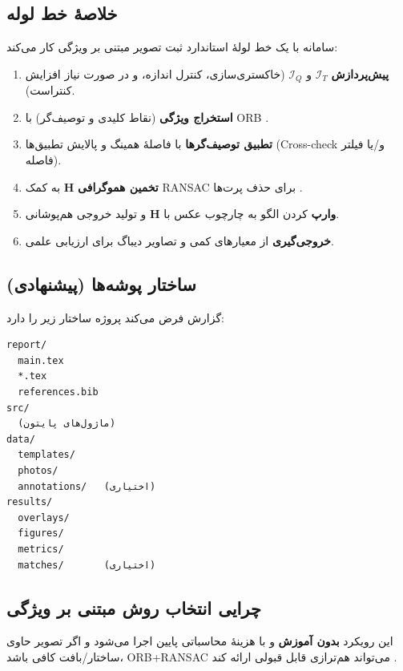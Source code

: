
\subsection{خلاصهٔ خط لوله}
سامانه با یک خط لولهٔ استاندارد ثبت تصویر مبتنی بر ویژگی کار می‌کند:
\begin{enumerate}
  \item \textbf{پیش‌پردازش} $\mathcal{I}_T$ و $\mathcal{I}_Q$ (خاکستری‌سازی، کنترل اندازه، و در صورت نیاز افزایش کنتراست).
  \item \textbf{استخراج ویژگی} (نقاط کلیدی و توصیف‌گر) با ORB \cite{Rublee2011ORB}.
  \item \textbf{تطبیق توصیف‌گرها} با فاصلهٔ همینگ و پالایش تطبیق‌ها (Cross-check و/یا فیلتر فاصله).
  \item \textbf{تخمین هموگرافی} $\mathbf{H}$ به کمک RANSAC برای حذف پرت‌ها \cite{FischlerBolles1981}.
  \item \textbf{وارپ} کردن الگو به چارچوب عکس با $\mathbf{H}$ و تولید خروجی هم‌پوشانی.
  \item \textbf{خروجی‌گیری} از معیارهای کمی و تصاویر دیباگ برای ارزیابی علمی.
\end{enumerate}

\subsection{ساختار پوشه‌ها (پیشنهادی)}
گزارش فرض می‌کند پروژه ساختار زیر را دارد:
\begin{verbatim}
report/
  main.tex
  *.tex
  references.bib
src/
  (ماژول‌های پایتون)
data/
  templates/
  photos/
  annotations/   (اختیاری)
results/
  overlays/
  figures/
  metrics/
  matches/       (اختیاری)
\end{verbatim}

\subsection{چرایی انتخاب روش مبتنی بر ویژگی}
این رویکرد \textbf{بدون آموزش} و با هزینهٔ محاسباتی پایین اجرا می‌شود و اگر تصویر حاوی ساختار/بافت کافی باشد، ORB+RANSAC می‌تواند هم‌ترازی قابل قبولی ارائه کند \cite{Rublee2011ORB,FischlerBolles1981}.
